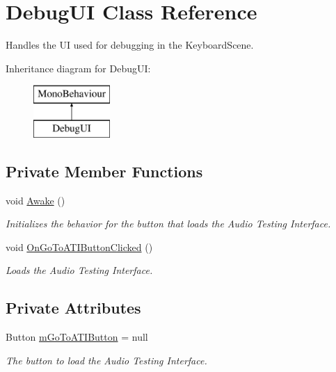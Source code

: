 \hypertarget{class_debug_u_i}{}\section{Debug\+UI Class Reference}
\label{class_debug_u_i}


Handles the UI used for debugging in the Keyboard\+Scene.  


Inheritance diagram for Debug\+UI\+:\begin{figure}[H]
\begin{center}
\leavevmode
\includegraphics[height=2.000000cm]{class_debug_u_i}
\end{center}
\end{figure}
\subsection*{Private Member Functions}
\begin{DoxyCompactItemize}
\item 
void \hyperlink{group___deb_u_i_unity_ga1369ce8825b055ee93722b2626a06d1e}{Awake} ()
\begin{DoxyCompactList}\small\item\em Initializes the behavior for the button that loads the Audio Testing Interface. \end{DoxyCompactList}\item 
void \hyperlink{group___deb_u_i_handlers_ga16e95ec9c2c6cc4cecf06e54e316f00c}{On\+Go\+To\+A\+T\+I\+Button\+Clicked} ()
\begin{DoxyCompactList}\small\item\em Loads the Audio Testing Interface. \end{DoxyCompactList}\end{DoxyCompactItemize}
\subsection*{Private Attributes}
\begin{DoxyCompactItemize}
\item 
Button \hyperlink{group___deb_u_i_priv_var_gaf9bf8d3b03e88b32bf6a567cd95dfafb}{m\+Go\+To\+A\+T\+I\+Button} = null
\begin{DoxyCompactList}\small\item\em The button to load the Audio Testing Interface. \end{DoxyCompactList}\end{DoxyCompactItemize}


